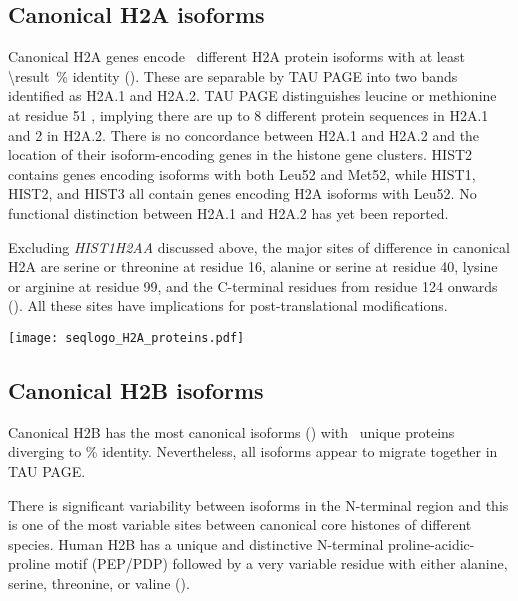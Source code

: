   \subsection{Canonical H2A isoforms}
    Canonical H2A genes encode \HTwoAUniqueProteins{}~different H2A
    protein isoforms with at least
     \SI{\result}{\percent} identity ().
    These are separable by TAU PAGE into two bands identified as H2A.1 and H2A.2.
    TAU PAGE distinguishes leucine or methionine at
    residue 51 \citep{FranklinZweidler1977,Zweidler1977},
    implying there are up to 8 different protein sequences in H2A.1 and 2 in H2A.2.
    There is no concordance between H2A.1 and H2A.2
    and the location of their isoform-encoding genes in the histone gene clusters.
    HIST2 contains genes encoding isoforms with both Leu52 and Met52,
    while HIST1, HIST2, and HIST3 all contain genes encoding H2A isoforms with Leu52.
    No functional distinction between H2A.1 and H2A.2 has yet been reported.

    Excluding \textit{HIST1H2AA} discussed above,
    the major sites of difference in canonical H2A are
    serine or threonine at residue 16,
    alanine or serine at residue 40,
    lysine or arginine at residue 99,
    and the C-terminal residues from residue 124 onwards ().
    All these sites have implications for post-translational modifications.

    \begin{table}
      \caption{%
        Canonical H2A protein isoforms.  Upper panel shows isoforms
        relative to the most common protein sequence.  Lower panel
        shows sequence logo of all isoforms aligned with invariant
        residues in grey.
      }
      \label{tab:H2A-consensus}
      
      \texttt{[image: seqlogo\_H2A\_proteins.pdf]}
    \end{table}

  \subsection{Canonical H2B isoforms}
    Canonical H2B has the most canonical isoforms ()
    with \HTwoBUniqueProteins{}~unique proteins
    diverging to \result\% identity.
    Nevertheless, all isoforms appear to migrate together in TAU PAGE.

    There is significant variability between isoforms in the N-terminal region
    and this is one of the most variable sites between canonical
    core histones of different species.
    Human H2B has a unique and distinctive N-terminal proline-acidic-proline motif (PEP/PDP)
    followed by a very variable residue with either alanine, serine,
    threonine, or valine ().

